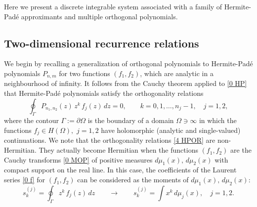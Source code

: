 \documentclass{amsart}
\theoremstyle{remark}
\numberwithin{equation}{section}
\begin{document}
Here we present a discrete integrable system associated with a family of {Her\-mite-Pad\'e}{} approximants  and multiple orthogonal polynomials.

\subsection{Two-dimensional recurrence relations}\label{sec:41}

We begin by recalling a generalization of orthogonal polynomials to {Her\-mite-Pad\'e}{} polynomials $P_{n,m}$ for two functions $(f_1,f_2)$, which are analytic in a neighbourhood of infinity. It follows from the Cauchy theorem applied to \eqref{0 HP} that {Her\-mite-Pad\'e}{} polynomials satisfy the orthogonality relations
\begin{equation}  \label{4 HPOR}
\oint_{\Gamma}P_{n_1,n_2}(z) \,z^k\,f_j(z)\, dz = 0, \qquad k=0,1,\ldots,n_j-1,\quad  j=1,2,       
\end{equation}
where the contour $\Gamma:=\partial\Omega$ is the boundary of a domain $\Omega\ni\infty$ in which the functions $f_j\in H(\Omega),\,\,j=1,2$ have holomorphic (analytic and single-valued) continuations. We note that the orthogonality relations \eqref{4 HPOR} are non-Hermitian. They actually become Hermitian when the functions $(f_1,f_2)$ are the Cauchy transforms \eqref{0 MOP} of positive measures $d\mu_1(x),\,d\mu_2(x)$ with compact support on the real line. In this case, the coefficients of the Laurent series \eqref{0 f} for $(f_1,f_2)$ can be considered as the moments of $d\mu_1(x),\,d\mu_2(x)$:
\[
s_k^{(j)} = \oint_{\Gamma} z^k\,f_j(z)\, dz \qquad \longrightarrow \qquad s_k^{(j)} = \int x^k\, d\mu_j(x),\quad j=1,2.
\]
\end{document}
